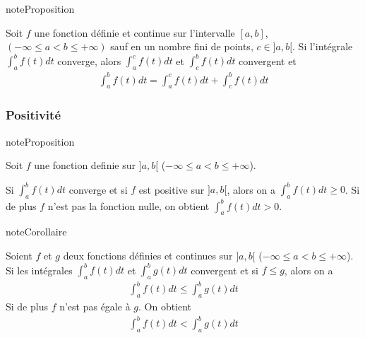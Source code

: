 \documentclass[letterpaper,10pt,french]{sphinxmanual}
\begin{document}
\begin{sphinxadmonition}{note}{Proposition}

\sphinxAtStartPar
Soit \(f\) une fonction définie et continue sur l’intervalle \([a, b]\), \((-\infty \leq a < b \leq +\infty)\) sauf en un nombre fini de points, \(c \in ]a, b[\). Si l’intégrale \(\int_a^b f(t)dt\) converge, alors \(\int_a^c f(t)dt\)  et \(\int_c^b f(t)dt\) convergent et
\begin{equation*}
\begin{split}
\int_a^b f(t)dt =\int_a^c f(t)dt + \int_c^b f(t)dt
\end{split}
\end{equation*}\end{sphinxadmonition}


\subsubsection{Positivité}
\label{\detokenize{def:positivite}}
\begin{sphinxadmonition}{note}{Proposition}

\sphinxAtStartPar
Soit \(f\) une fonction definie sur \(]a, b[\) (\(-\infty \leq a < b \leq +\infty\)).

\sphinxAtStartPar
Si \(\int_a^b f(t)dt\) converge et si \(f\) est positive sur \(]a, b[\), alors on a \(\int_a^b f(t)dt\geq 0\). Si de plus \(f\) n’est pas la fonction nulle, on obtient \(\int_a^b f(t)dt>0\).
\end{sphinxadmonition}

\begin{sphinxadmonition}{note}{Corollaire}

\sphinxAtStartPar
Soient \(f\) et \(g\) deux fonctions définies et continues sur \(]a, b[\) (\(-\infty \leq a < b \leq +\infty\)).
Si les intégrales \(\int_a^b f(t)dt\) et \(\int_a^b g(t)dt\) convergent et si \(f\leq g\), alors on a
\begin{equation*}
\begin{split}
\int_a^bf(t)dt \leq \int_a^b g(t)dt
\end{split}
\end{equation*}
\sphinxAtStartPar
Si de plus \(f\) n’est pas égale à \(g\). On obtient
\begin{equation*}
\begin{split}
\int_a^b f(t)dt < \int_a^b g(t)dt
\end{split}
\end{equation*}\end{sphinxadmonition}
\end{document}
